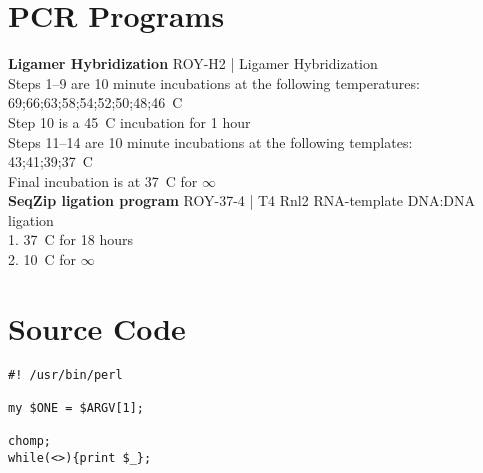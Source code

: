 \section{PCR Programs}\label{apx: PCR Programs}
\textbf{Ligamer Hybridization}
ROY-H2 | Ligamer Hybridization\\
  Steps 1–9 are 10 minute incubations at the following temperatures:\\
  69;66;63;58;54;52;50;48;46\degree~C\\
  Step 10 is a 45\degree~C incubation for 1 hour\\
  Steps 11–14 are 10 minute incubations at the following templates:\\
  43;41;39;37\degree~C\\
  Final incubation is at 37\degree~C for $\infty$\\

\textbf{SeqZip ligation program}
ROY-37-4 | T4 Rnl2 RNA-template DNA:DNA ligation\\
  1. 37\degree~C for 18 hours\\
  2. 10\degree~C for $\infty$ \\

\section{Source Code}\label{apx: Source Code}


\begin{lstlisting}
#! /usr/bin/perl

my $ONE = $ARGV[1];

chomp;
while(<>){print $_};
\end{lstlisting}